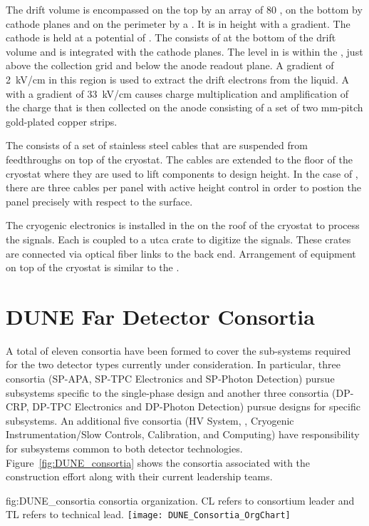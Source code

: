 The drift volume is encompassed on the top by an array of \num{80}
, on the bottom by cathode planes and on the perimeter by a 
. It is \dpmaxdrift %
in height with a
\dpnominaldriftfield %
gradient. The cathode is held at a
potential of \dptargetdriftvoltneg{}. %
The  
consists of \dpnumpmtch %
 at the bottom of the drift volume
and is integrated with the cathode planes.  
The  level in
 is within the , just above the
collection grid and below the anode readout plane. A gradient of
\SI{2}{\kilo\volt/\centi\meter} in this region is used to extract the
drift electrons from the liquid. A  with a gradient of
\SI{33}{\kilo\volt/\centi\meter} causes charge multiplication and
amplification of the charge that  is then collected on the anode 
consisting of a %
set of two \dpstrippitch\si{mm}-pitch %
gold-plated copper strips.

The   consists of a set of stainless steel
cables that are suspended from feedthroughs on top of the
cryostat. The cables are extended to the floor of the cryostat where
they are used to lift components to design height. In the case of
, there are three cables per panel with active height
control in order to postion the panel precisely with respect to the
 surface.

The cryogenic  electronics is installed in the  on the roof of the cryostat to process the
 signals. Each  is coupled to a {utca} crate to
digitize the signals. These crates are connected via optical fiber links to the 
back end. Arrangement of equipment on top of the cryostat is similar to the .

\section{DUNE Far Detector Consortia}
\label{sec:fdconsortia}

A total of eleven  consortia have been formed to cover 
the sub-systems required for the two detector types currently under
consideration.  In particular, three consortia (SP-APA, SP-TPC
Electronics and SP-Photon Detection) pursue subsystems specific to
the single-phase design and another three consortia (DP-CRP, DP-TPC
Electronics and DP-Photon Detection) pursue designs for 
specific subsystems.  An additional five consortia (HV System, ,
Cryogenic Instrumentation/Slow Controls, Calibration, and Computing)
have responsibility for subsystems common to both detector
technologies.  Figure~\ref{fig:DUNE_consortia} shows the consortia 
associated with the  construction effort along with their 
current leadership teams.  
\begin{dunefigure}{fig:DUNE_consortia}
  { consortia organization. CL refers to consortium leader and TL refers to technical lead.}
  \texttt{[image: DUNE\_Consortia\_OrgChart]}
\end{dunefigure}

